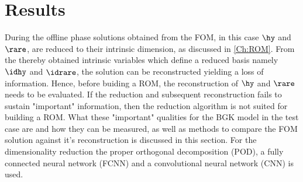 
\chapter{Results}
\label{Results}

During the offline phase solutions obtained from the FOM, in this case $\hy$ and $\rare$, are reduced to their intrinsic dimension, as discussed in \cref{Ch:ROM}. From the thereby obtained intrinsic variables which define a reduced basis namely $\idhy$ and $\idrare$, the solution can be reconstructed yielding a loss of information. Hence, before buiding a ROM, the reconstruction of $\hy$ and $\rare$ needs to be evaluated. If the reduction and subsequent reconstruction fails to sustain "important" information, then the reduction algorithm is not suited for building a ROM. What these "important" qualities for the BGK model in the test case are and how they can be measured, as well as methods to compare the FOM solution against it's reconstruction is discussed in this section. For the dimensionality reduction the proper orthogonal decomposition (POD), a fully connected neural network (FCNN) and a convolutional neural network (CNN) is used.\\

